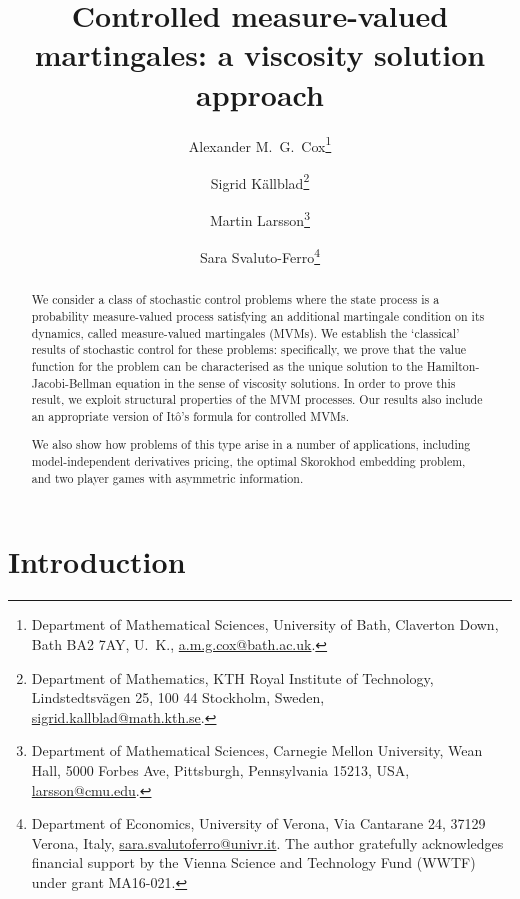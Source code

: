 \documentclass{article}
\theoremstyle{definition}
\numberwithin{equation}{section}
\numberwithin{theorem}{section}
\begin{document}
\title{Controlled measure-valued martingales: a viscosity solution approach}
\author{Alexander M.~G.~Cox\thanks{Department of Mathematical
    Sciences, University of Bath, Claverton Down, Bath BA2 7AY, U.~K., \url{a.m.g.cox@bath.ac.uk}.}
\and Sigrid K{\"a}llblad\thanks{Department of Mathematics, KTH Royal Institute of Technology, Lindstedtsv{\"a}gen 25, 100 44 Stockholm, Sweden, \url{sigrid.kallblad@math.kth.se}.
}
\and Martin Larsson\thanks{Department of Mathematical Sciences, Carnegie Mellon University, Wean Hall, 5000 Forbes Ave, Pittsburgh, Pennsylvania 15213, USA, \url{larsson@cmu.edu}.}
\and Sara Svaluto-Ferro\thanks{Department of Economics, University of Verona, Via Cantarane 24, 37129 Verona, Italy, \url{sara.svalutoferro@univr.it}.
The author gratefully acknowledges financial support by the Vienna Science and Technology Fund (WWTF) under grant MA16-021.}}
\maketitle


\begin{abstract}
	
	We consider a class of stochastic control problems where the state process is a probability measure-valued process satisfying an additional martingale condition on its dynamics, called measure-valued martingales (MVMs). We establish the `classical' results of stochastic control for these problems: specifically, we prove that the value function for the problem can be characterised as the unique solution to the Hamilton-Jacobi-Bellman equation in the sense of viscosity solutions. In order to prove this result, we exploit structural properties of the MVM processes. Our results also include an appropriate version of It\^o's formula for controlled MVMs.

	We also show how problems of this type arise in a number of applications, including model-independent derivatives pricing, the optimal Skorokhod embedding problem, and two player games with asymmetric information.
	
\end{abstract}



{\hypersetup{linkcolor=black}
\tableofcontents
}



\section{Introduction}
\end{document}

